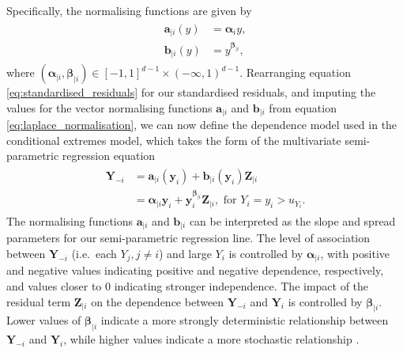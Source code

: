 \documentclass{article}
\numberwithin{equation}{section}
\begin{document}
Specifically, the normalising functions are given by
\begin{align} \label{eq:laplace_normalisation}
  \begin{split}
    \bm{a}_{\mid i}(y) &= \bm{\alpha}_i y, \\
    \bm{b}_{\mid i}(y) &= y^{\bm{\beta}_{\mid i}}, 
  \end{split}
\end{align}
where $(\bm{\alpha}_{\mid i}, \bm{\beta}_{\mid i}) \in [-1, 1]^{d-1} \times (-\infty, 1)^{d-1}$. %
Rearranging equation \ref{eq:standardised_residuals} for our standardised residuals, and imputing the values for the vector normalising functions $\bm{a}_{\mid i}$ and $\bm{b}_{\mid i}$ from equation \ref{eq:laplace_normalisation}, we can now define the dependence model used in the conditional extremes model, which takes the form of the multivariate semi-parametric regression equation
\begin{align} \label{eq:ce_model}
  \begin{split}
    \bm{Y}_{-i} &= \bm{a}_{\mid i}(\bm{y}_i) + \bm{b}_{\mid i}(\bm{y}_i)\bm{Z}_{\mid i} \\
                &= \bm{\alpha}_{\mid i}\bm{y}_i + \bm{y}_i^{\bm{\beta}_{\mid i}}\bm{Z}_{\mid i}, \text{ for } Y_i = y_i > u_{Y_i}.
  \end{split}
\end{align}
The normalising functions $\bm{a}_{\mid i}$ and $\bm{b}_{\mid i}$ can be interpreted as the slope and spread parameters for our semi-parametric regression line.
The level of association between $\bm{Y}_{-i}$ (i.e.\ each $Y_j, j \ne i$) and large $Y_i$ is controlled by $\bm{\alpha}_{\mid i}$, with positive and negative values indicating positive and negative dependence, respectively, and values closer to 0 indicating stronger independence.
The impact of the residual term $\bm{Z}_{\mid i}$ on the dependence between $\bm{Y}_{-i}$ and $\bm{Y}_i$ is controlled by $\bm{\beta}_{\mid i}$.
Lower values of $\bm{\beta}_{\mid i}$ indicate a more strongly deterministic relationship between $\bm{Y}_{-i}$ and $\bm{Y}_i$, while higher values indicate a more stochastic relationship \citep{Winter2016}.
\end{document}
